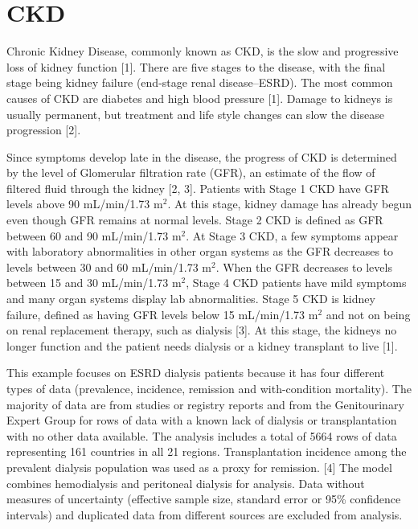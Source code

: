 \chapter{CKD}
\label{applications-fits_incon_v_con}

Chronic Kidney Disease, commonly known as CKD, is the slow and progressive loss of kidney function [1]. There are five stages to the disease, with the final stage being kidney failure (end-stage renal disease--ESRD). The most common causes of CKD are diabetes and high blood pressure [1].  Damage to kidneys is usually permanent, but treatment and life style changes can slow the disease progression [2].

Since symptoms develop late in the disease, the progress of CKD is determined by the level of Glomerular filtration rate (GFR), an estimate of the flow of filtered fluid through the kidney  [2, 3]. Patients with Stage 1 CKD have GFR levels above 90 mL/min/1.73 m$^2$.  At this stage, kidney damage has already begun even though GFR remains at normal levels.   Stage 2 CKD is defined as GFR between 60 and 90 mL/min/1.73 m$^2$.  At Stage 3 CKD, a few symptoms appear with laboratory abnormalities in other organ systems as the GFR decreases to levels between 30 and 60 mL/min/1.73 m$^2$.  When the GFR decreases to levels between 15 and 30 mL/min/1.73 m$^2$, Stage 4 CKD patients have mild symptoms and many organ systems display lab abnormalities.  Stage 5 CKD is kidney failure, defined as having GFR levels below 15 mL/min/1.73 m$^2$ and not on being on renal replacement therapy, such as dialysis [3].  At this stage, the kidneys no longer function and the patient needs dialysis or a kidney transplant to live [1].

This example focuses on ESRD dialysis patients because it has four different types of data (prevalence, incidence, remission and with-condition mortality).  The majority of data are from studies or registry reports and from the Genitourinary Expert Group for rows of data with a known lack of dialysis or transplantation with no other data available.  The analysis includes a total of 5664 rows of data representing 161 countries in all 21 regions. Transplantation incidence among the prevalent dialysis population was used as a proxy for remission. [4]  The model combines hemodialysis and peritoneal dialysis for analysis.  Data without measures of uncertainty (effective sample size, standard error or 95\% confidence intervals) and duplicated data from different sources are excluded from analysis.

